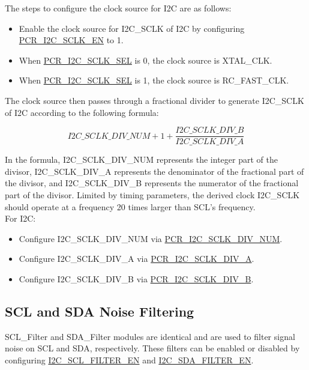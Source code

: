\documentclass[main\_\_EN.tex]{subfiles}
\begin{document}
The steps to configure the clock source for I2C are as follows:

\begin{itemize}
    \item Enable the clock source for I2C\_SCLK of I2C by configuring \hyperref[fielddesc:PCRI2CSCLKEN]{PCR\_I2C\_SCLK\_EN} to 1.
    \item When \hyperref[fielddesc:PCRI2CSCLKSEL]{PCR\_I2C\_SCLK\_SEL} is 0, the clock source is XTAL\_CLK.
    \item When \hyperref[fielddesc:PCRI2CSCLKSEL]{PCR\_I2C\_SCLK\_SEL} is 1, the clock source is RC\_FAST\_CLK.
\end{itemize}

The clock source then passes through a fractional divider to generate I2C\_SCLK of I2C according to the following formula:

\begin{equation*}
I2C\_SCLK\_DIV\_NUM + 1+\frac{ I2C\_SCLK\_DIV\_B}{I2C\_SCLK\_DIV\_A}
\end{equation*}

In the formula, I2C\_SCLK\_DIV\_NUM represents the integer part of the divisor, I2C\_SCLK\_DIV\_A represents the denominator of the fractional part of the divisor, and I2C\_SCLK\_DIV\_B represents the numerator of the fractional part of the divisor. Limited by timing parameters, the derived clock I2C\_SCLK should operate at a frequency 20 times larger than SCL's frequency.\\

For I2C:

\begin{itemize}
    \item Configure I2C\_SCLK\_DIV\_NUM via \hyperref[fielddesc:PCRI2CSCLKDIVNUM]{PCR\_I2C\_SCLK\_DIV\_NUM}.
    \item Configure I2C\_SCLK\_DIV\_A via \hyperref[fielddesc:PCRI2CSCLKDIVA]{PCR\_I2C\_SCLK\_DIV\_A}.
    \item Configure I2C\_SCLK\_DIV\_B via \hyperref[fielddesc:PCRI2CSCLKDIVB]{PCR\_I2C\_SCLK\_DIV\_B}.
\end{itemize}

\subsection{SCL and SDA Noise Filtering}

SCL\_Filter and SDA\_Filter modules are identical and are used to filter signal noise on SCL and SDA, respectively. These filters can be enabled or disabled by configuring \hyperref[fielddesc:I2CSCLFILTEREN]{I2C\_SCL\_FILTER\_EN} and \hyperref[fielddesc:I2CSDAFILTEREN]{I2C\_SDA\_FILTER\_EN}.
\end{document}
